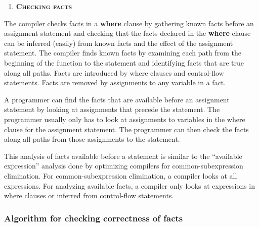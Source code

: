 \documentclass[]{article}
\begin{document}
\begin{enumerate}
\def\labelenumi{\arabic{enumi}.}
\item
  \protect\hypertarget{ux5fToc420589188}{}{\protect\hypertarget{ux5fToc422906979}{}{\protect\hypertarget{ux5fToc424307719}{}{\protect\hypertarget{ux5fToc426641117}{}{\protect\hypertarget{ux5fToc435434992}{}{\protect\hypertarget{ux5fToc437460825}{}{\protect\hypertarget{ux5fToc440445506}{}{\protect\hypertarget{ux5fToc440449288}{}{\protect\hypertarget{ux5fToc440551938}{}{}}}}}}}}}\textbf{\textsc{Checking
  facts}}
\end{enumerate}

The compiler checks facts in a \textbf{where} clause by gathering known
facts before an assignment statement and checking that the facts
declared in the \textbf{where} clause can be inferred (easily) from
known facts and the effect of the assignment statement. The compiler
finds known facts by examining each path from the beginning of the
function to the statement and identifying facts that are true along all
paths. Facts are introduced by where clauses and control-flow
statements. Facts are removed by assignments to any variable in a fact.

A programmer can find the facts that are available before an assignment
statement by looking at assignments that precede the statement. The
programmer usually only has to look at assignments to variables in the
where clause for the assignment statement. The programmer can then check
the facts along all paths from those assignments to the statement.

This analysis of facts available before a statement is similar to the
``available expression'' analysis done by optimizing compilers for
common-subexpression elimination. For common-subexpression elimination,
a compiler looks at all expressions. For analyzing available facts, a
compiler only looks at expressions in where clauses or inferred from
control-flow statements.

\subsubsection{\texorpdfstring{\protect\hypertarget{ux5fToc420589189}{}{\protect\hypertarget{ux5fToc422906980}{}{\protect\hypertarget{ux5fToc424307720}{}{\protect\hypertarget{ux5fToc426641118}{}{\protect\hypertarget{ux5fToc435434993}{}{\protect\hypertarget{ux5fToc437460826}{}{\protect\hypertarget{ux5fToc440445507}{}{\protect\hypertarget{ux5fToc440449289}{}{\protect\hypertarget{ux5fToc440551939}{}{}}}}}}}}}Algorithm
for checking correctness of
facts}{Algorithm for checking correctness of facts}}\label{algorithm-for-checking-correctness-of-facts}
\end{document}
